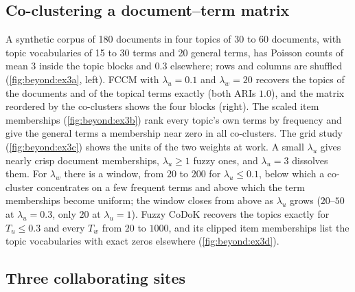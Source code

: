 \subsection{Co-clustering a document--term matrix}

A synthetic corpus of 180 documents in four topics of 30 to 60 documents, with topic vocabularies of 15 to 30 terms and 20 general terms, has Poisson counts of mean $3$ inside the topic blocks and $0.3$ elsewhere; rows and columns are shuffled (\cref{fig:beyond:ex3a}, left). FCCM with $\lambda_u=0.1$ and $\lambda_w=20$ recovers the topics of the documents and of the topical terms exactly (both ARIs $1.0$), and the matrix reordered by the co-clusters shows the four blocks (right). The scaled item memberships (\cref{fig:beyond:ex3b}) rank every topic's own terms by frequency and give the general terms a membership near zero in all co-clusters. The grid study (\cref{fig:beyond:ex3c}) shows the units of the two weights at work. A small $\lambda_u$ gives nearly crisp document memberships, $\lambda_u\ge1$ fuzzy ones, and $\lambda_u=3$ dissolves them. For $\lambda_w$ there is a window, from $20$ to $200$ for $\lambda_u\le0.1$, below which a co-cluster concentrates on a few frequent terms and above which the term memberships become uniform; the window closes from above as $\lambda_u$ grows ($20$--$50$ at $\lambda_u=0.3$, only $20$ at $\lambda_u=1$). Fuzzy CoDoK recovers the topics exactly for $T_u\le0.3$ and every $T_w$ from $20$ to $1000$, and its clipped item memberships list the topic vocabularies with exact zeros elsewhere (\cref{fig:beyond:ex3d}).


\subsection{Three collaborating sites}

